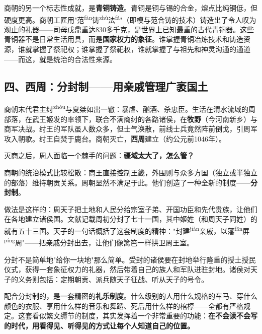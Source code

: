 \documentclass[a4paper,12pt]{ctexart}
\newcommand{\ruby}[2]{#1\textsuperscript{#2}}
\begin{document}
商朝的另一个标志性成就，是\textbf{青铜铸造}。青铜是铜与锡的合金，熔点比纯铜低，但硬度更高。商朝工匠用"\ruby{范}{fàn}\ruby{铸}{zhù}\ruby{法}{fǎ}"（即模与范合铸的技术）铸造出了令人叹为观止的礼器——司母戊鼎重达830多千克，是世界上已知最重的古代青铜器。这些青铜器不是日常生活用具，而是\textbf{国家权力的象征}。谁掌握青铜冶炼技术和铸造资源，谁就掌握了祭祀权；谁掌握了祭祀权，谁就掌握了与祖先和神灵沟通的通道——而这，就是统治的合法性来源。

\subsection*{四、西周：分封制——用亲戚管理广袤国土}

商朝末代君主\ruby{纣}{zhòu}与夏桀如出一辙：暴虐、酗酒、杀忠臣。生活在渭水流域的周部落，在武王姬发的率领下，联合不满商纣的各路诸侯，在\textbf{牧野}（今河南新乡）与商军决战。纣王的军队虽人数众多，但士气涣散，前线士兵竟然阵前倒戈，引周军攻入朝歌。纣王自焚于鹿台。商朝灭亡，\textbf{西周}建立（约公元前1046年）。

灭商之后，周人面临一个棘手的问题：\textbf{疆域太大了，怎么管？}

商朝的统治模式比较松散：商王直接控制王畿，外围则与众多方国（独立或半独立的部落）维持朝贡关系。周朝显然不满足于此。他们创造了一种全新的制度——\textbf{分封制}。

做法是这样的：周天子把土地和人民分给宗室子弟、开国功臣和先代贵族，让他们在各地建立诸侯国。文献记载周初分封了七十一国，其中姬姓（和周天子同姓）的就有五十三国。天子的一句话概括了这套制度的精神："封\ruby{建}{jiàn}亲戚，以\ruby{藩}{fān}\ruby{屏}{píng}周"——把亲戚分封出去，让他们像篱笆一样拱卫周王室。

分封不是简单地"给你一块地"那么简单。受封的诸侯要在封地举行隆重的授土授民仪式，获得一套象征权力的礼器，然后带着自己的族人和军队进驻封地。诸侯对天子的义务则包括：定期朝贡、派兵随天子征战、听从天子的号令。

配合分封制的，是一套精密的\textbf{礼乐制度}。什么级别的人用什么规格的车马、穿什么颜色的衣服、享用什么样的音乐和舞蹈、死后用什么样的棺椁——全都有严格规定。这套看似繁文缛节的制度，其实发挥着一个非常重要的功能：\textbf{在不会读不会写的时代，用看得见、听得见的方式让每个人知道自己的位置。}
\end{document}
